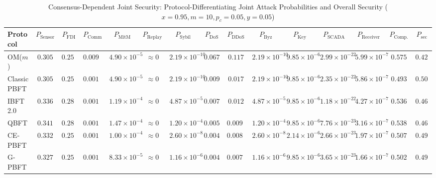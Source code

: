 \begin{table}[t]
\caption{Consensus-Dependent Joint Security: Protocol-Differentiating Joint Attack Probabilities and Overall Security ($x{=}0.95, m{=}10, p_c{=}0.05, y{=}0.05$)}
\label{tab:consensus_security}
\centering
\scriptsize
\setlength{\tabcolsep}{2.5pt}
\begin{tabular}{@{}l|cccccccccccc|cc@{}}
\toprule
\textbf{Protocol} & \textbf{$P_{\mathrm{Sensor}}$} & \textbf{$P_{\mathrm{FDI}}$} & \textbf{$P_{\mathrm{Comm}}$} & \textbf{$P_{\mathrm{MitM}}$} & \textbf{$P_{\mathrm{Replay}}$} & \textbf{$P_{\mathrm{Sybil}}$} & \textbf{$P_{\mathrm{DoS}}$} & \textbf{$P_{\mathrm{DDoS}}$} & \textbf{$P_{\mathrm{Byz}}$} & \textbf{$P_{\mathrm{Key}}$} & \textbf{$P_{\mathrm{SCADA}}$} & \textbf{$P_{\mathrm{Receiver}}$} & \textbf{$P_{\mathrm{Comp.}}$} & \textbf{$P_{\mathrm{sec}}$} \\
\midrule
OM($m$) & $0.305$ & $0.251$ & $0.0099$ & $4.90{\times}10^{-5}$ & $\approx 0$ & $2.19{\times}10^{-10}$ & $0.067$ & $0.117$ & $2.19{\times}10^{-10}$ & $9.85{\times}10^{-6}$ & $2.99{\times}10^{-22}$ & $5.99{\times}10^{-7}$ & \textbf{$0.575$} & \textbf{$0.425$} \\
Classic PBFT & $0.305$ & $0.251$ & $0.0014$ & $4.90{\times}10^{-5}$ & $\approx 0$ & $2.19{\times}10^{-10}$ & $0.0095$ & $0.017$ & $2.19{\times}10^{-10}$ & $9.85{\times}10^{-6}$ & $2.35{\times}10^{-22}$ & $5.86{\times}10^{-7}$ & \textbf{$0.493$} & \textbf{$0.507$} \\
IBFT 2.0 & $0.336$ & $0.287$ & $0.0011$ & $1.19{\times}10^{-4}$ & $\approx 0$ & $4.87{\times}10^{-5}$ & $0.0070$ & $0.012$ & $4.87{\times}10^{-5}$ & $9.85{\times}10^{-6}$ & $1.18{\times}10^{-22}$ & $4.27{\times}10^{-7}$ & \textbf{$0.536$} & \textbf{$0.464$} \\
QBFT & $0.341$ & $0.287$ & $0.0010$ & $1.47{\times}10^{-4}$ & $\approx 0$ & $1.20{\times}10^{-4}$ & $0.0056$ & $0.0097$ & $1.20{\times}10^{-4}$ & $9.85{\times}10^{-6}$ & $7.76{\times}10^{-23}$ & $3.16{\times}10^{-7}$ & \textbf{$0.538$} & \textbf{$0.462$} \\
CE-PBFT & $0.332$ & $0.251$ & $0.0012$ & $1.00{\times}10^{-4}$ & $\approx 0$ & $2.60{\times}10^{-8}$ & $0.0048$ & $0.0083$ & $2.60{\times}10^{-8}$ & $2.14{\times}10^{-6}$ & $2.66{\times}10^{-23}$ & $1.97{\times}10^{-7}$ & \textbf{$0.507$} & \textbf{$0.493$} \\
G-PBFT & $0.327$ & $0.251$ & $0.0012$ & $8.33{\times}10^{-5}$ & $\approx 0$ & $1.16{\times}10^{-6}$ & $0.0040$ & $0.0070$ & $1.16{\times}10^{-6}$ & $9.85{\times}10^{-6}$ & $3.65{\times}10^{-23}$ & $1.66{\times}10^{-7}$ & \textbf{$0.502$} & \textbf{$0.498$} \\

\end{tabular}
\end{table}
